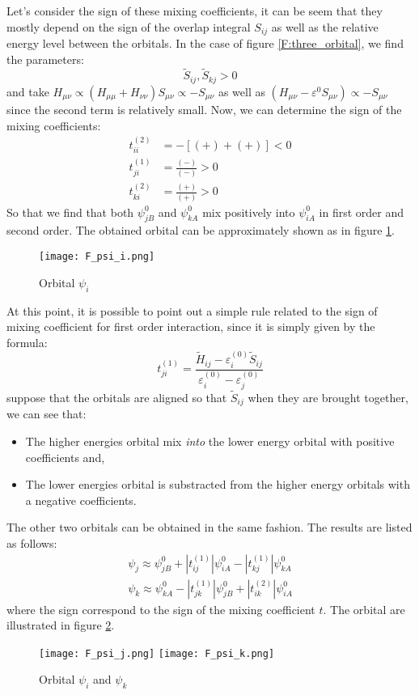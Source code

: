 \documentclass{article}
\newcommand{\order}[2]{#1^{(#2)}}
\begin{document}
Let's consider the sign of these mixing coefficients, it can be seem that they mostly depend on the sign of the overlap integral $S_{ij}$ as well as the relative 
energy level between the orbitals. In the case of figure \ref{F:three_orbital}, we find the parameters:
\begin{equation}
    \tilde{S}_{ij}, \tilde{S}_{kj} > 0 
\end{equation}
and take $H_{\mu\nu} \propto (H_{\mu\mu} + H_{\nu\nu}) S_{\mu\nu} \propto - S_{\mu\nu}$ as well as $(H_{\mu\nu} - \varepsilon^0 S_{\mu\nu}) \propto - S_{\mu\nu} $
since the second term is relatively small. Now, we can determine the sign of the mixing coefficients:
\begin{align}
    \order{t_{ii}}{2} &= - [ (+) + (+) ] < 0 \\ 
    \order{t_{ji}}{1} &= \frac{(-)}{(-)} > 0 \\
    \order{t_{ki}}{2} &= \frac{(+)}{(+)} > 0
\end{align}
So that we find that both $\psi_{jB}^0$ and $\psi_{kA}^0$ mix positively into $\psi_{iA}^0$ in first order and second order. The obtained orbital 
can be approximately shown as in figure \ref{F:psi_i}. 
\begin{figure}[h!]
    \centering
    \texttt{[image: F\_psi\_i.png]}
    \caption{Orbital $\psi_{i}$}
    \label{F:psi_i}
\end{figure}

At this point, it is possible to point out a simple rule related to the sign of mixing coefficient 
for first order interaction, since it is simply given by the formula:
\[ t_{ji}^{(1)} = \frac{\tilde{H}_{ij}- \order{\varepsilon_i}{0} \tilde{S}_{ij}}{\order{\varepsilon_i}{0} - \order{\varepsilon_j}{0}}\] 
suppose that the orbitals are aligned so that $\tilde{S}_{ij}$ when they are brought together, we can 
see that:
\begin{itemize}
    \item The higher energies orbital mix \emph{into} the lower energy orbital with positive coefficients and,
    \item The lower energies orbital is substracted from the higher energy orbitals with a negative coefficients.
\end{itemize}

The other two orbitals can be obtained in the same fashion. The results are listed as follows:
\begin{align}
    \psi_{j} \approx \psi_{jB}^0 + |\order{t_{ij}}{1}| \psi_{iA}^0 - |\order{t_{kj}}{1}| \psi_{kA}^0 \\ 
    \psi_k \approx \psi_{kA}^0 - |\order{t_{jk}}{1}| \psi_{jB}^0 + |\order{t_{ik}}{2}| \psi_{iA}^0
\end{align}
where the sign correspond to the sign of the mixing coefficient $t$. The orbital are illustrated in figure \ref{F:psi_jk}.
\begin{figure}[h!]
    \centering
    \texttt{[image: F\_psi\_j.png]}
    \texttt{[image: F\_psi\_k.png]}
    \caption{Orbital $\psi_{i}$ and $\psi_{k}$}
    \label{F:psi_jk}
\end{figure}
\end{document}
